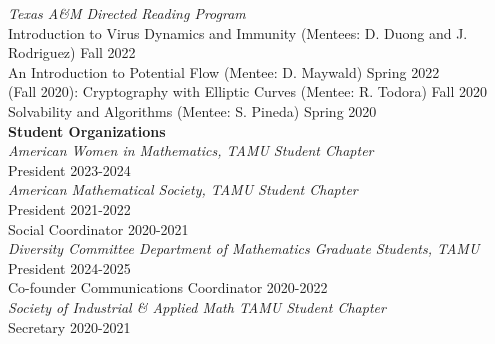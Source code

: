 \documentclass[10pt,a4paper,roman]{moderncv}
\begin{document}
\textit{Texas A\&M Directed Reading Program}\\
Introduction to Virus Dynamics and Immunity (Mentees: D. Duong and J. Rodriguez) \hfill Fall 2022\\
An Introduction to Potential Flow (Mentee: D. Maywald) \hfill Spring 2022\\
(Fall 2020): Cryptography with Elliptic Curves (Mentee: R. Todora) \hfill Fall 2020\\
Solvability and Algorithms (Mentee: S. Pineda) \hfill Spring 2020\\



\textbf{Student Organizations}\\

\textit{American Women in Mathematics, TAMU Student Chapter}\\
President \hfill 2023-2024\\
\textit{American Mathematical Society, TAMU Student Chapter}\\
President \hfill 2021-2022\\
Social Coordinator \hfill 2020-2021\\
\textit{Diversity Committee Department of Mathematics Graduate Students, TAMU}\\
President \hfill 2024-2025\\
Co-founder Communications Coordinator \hfill 2020-2022\\
\textit{Society of Industrial \& Applied Math TAMU Student Chapter}\\
Secretary \hfill 2020-2021\\
\end{document}
